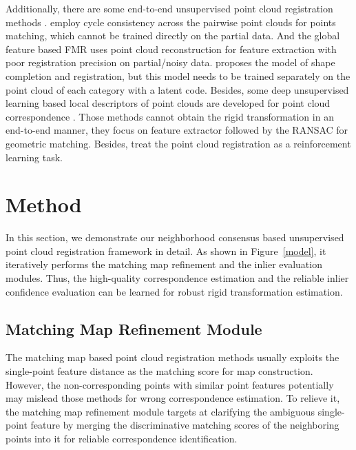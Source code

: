 \documentclass[letterpaper]{article} %
\begin{document}
	Additionally, there are some end-to-end unsupervised point cloud registration methods \cite{kadam2020unsupervised,feng2021recurrent,li2019pc,el2021unsupervisedr}.
	\cite{yang2020mapping,groueix2019unsupervised} employ cycle consistency across the pairwise point clouds for points matching, which cannot be trained directly on the partial data. And the global feature based FMR \cite{huang2020feature} uses point cloud reconstruction for feature extraction with poor registration precision on partial/noisy data. \cite{li2020unsupervised} proposes the model of shape completion and registration, but this model needs to be trained separately on the point cloud of each category with a latent code. %
	Besides, some deep unsupervised learning based local descriptors of point clouds are developed for point cloud correspondence \cite{li2021updesc,li2019usip}. Those methods cannot obtain the rigid transformation in an end-to-end manner, they focus on feature extractor followed by the RANSAC for geometric matching.
	Besides, \cite{bauer2021reagent,jiang2021CEMNet,jiangplanning} treat the point cloud registration as a reinforcement learning task.


	\section{Method}%
	In this section, we demonstrate our neighborhood consensus based unsupervised point cloud registration framework in detail.
	As shown in Figure~\ref{model}, it iteratively performs the matching map refinement and the inlier evaluation modules. Thus, the high-quality correspondence estimation and the reliable inlier confidence evaluation can be learned for robust rigid transformation estimation.

	\subsection{Matching Map Refinement Module}\label{matching} %
	\label{refine}
	The matching map based point cloud registration methods \cite{yew2020rpm} usually exploits the single-point feature distance as the matching score for map construction. However, the non-corresponding points with similar point features potentially may mislead those methods for wrong correspondence estimation. To relieve it, the matching map refinement module targets at clarifying the ambiguous single-point feature by merging the discriminative matching scores of the neighboring points into it for reliable correspondence identification.
\end{document}
